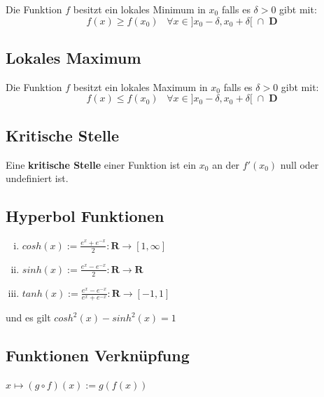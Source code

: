 \documentclass[8pt]{article}
\begin{document}
\begin{multicols*}{3}
Die Funktion $f$ besitzt ein lokales Minimum in $x_0$ falls es $\delta > 0$ gibt mit:
$$f(x) \geq f(x_0) \;\;\; \forall x \in ]x_0 - \delta, x_0 + \delta[\; \cap \; \mathbf{D}$$

\subsection{Lokales Maximum}

Die Funktion $f$ besitzt ein lokales Maximum in $x_0$ falls es $\delta > 0$ gibt mit:
$$f(x) \leq f(x_0) \;\;\; \forall x \in ]x_0 - \delta, x_0 + \delta[\; \cap \; \mathbf{D}$$

\subsection{Kritische Stelle}

Eine \textbf{kritische Stelle} einer Funktion ist ein $x_0$ an der $f'(x_0)$ null
oder undefiniert ist.

\subsection{Hyperbol Funktionen}

\begin{enumerate}[(i)]
  \item $cosh(x) := \frac{e^x + e^{-x}}{2}: \mathbf{R} \rightarrow [1, \infty]$
  \item $sinh(x) := \frac{e^x - e^{-x}}{2}: \mathbf{R} \rightarrow \mathbf{R}$
  \item $tanh(x) := \frac{e^x - e^{-x}}{e^x + e^{-x}}: \mathbf{R} \rightarrow [-1, 1]$
\end{enumerate}
und es gilt $cosh^2(x) - sinh^2(x) = 1$



\subsection{Funktionen Verknüpfung}

$
x \mapsto (g \circ f)(x) := g(f(x))
$


\end{multicols*}
\end{document}
